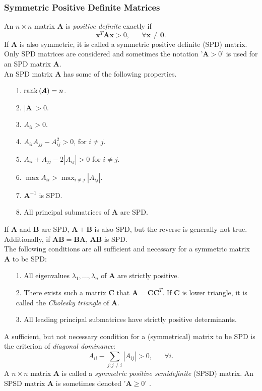 \subsubsection*{Symmetric Positive Definite Matrices}
An $n \times n$ matrix $\pmb{A}$ is \textit{positive definite} exactly if
\begin{equation*}
    \pmb{x}^T\pmb{A}\pmb{x}>0,\hspace{20pt}\forall\pmb{x}\neq\pmb{0}.
\end{equation*}
If $\pmb{A}$ is also symmetric, it is called a symmetric positive definite (SPD) matrix. Only SPD matrices are considered and sometimes the notation '$\pmb{A}>0$' is used for an SPD matrix $\pmb{A}$. \\
An SPD matrix $\pmb{A}$ has some of the following properties.
\begin{itemize}
    \item[1.] $\hbox{rank}\left(\pmb{A}\right)=n$.
    \item[2.] $|\pmb{A}|>0$.
    \item[3.] $A_{ii}>0$.
    \item[4.] $A_{ii}A_{jj}-A_{ij}^2>0$, for $i\neq j$.
    \item[5.] $A_{ii} + A_{jj}-2|A_{ij}|>0$ for $i\neq j$.
    \item[6.] $\max A_{ii}>\max_{i\neq j}|A_{ij}|$.
    \item[7.] $\pmb{A}^{-1}$ is SPD.
    \item[8.] All principal submatrices of $\pmb{A}$ are SPD.
\end{itemize}
If $\pmb{A}$ and $\pmb{B}$ are SPD, $\pmb{A}+\pmb{B}$ is also SPD, but the reverse is generally not true. Additionally, if $\pmb{AB}=\pmb{BA}$, $\pmb{AB}$ is SPD. \\
The following conditions are all sufficient and necessary for a symmetric matrix $\pmb{A}$ to be SPD:
\begin{itemize}
    \item[1.] All eigenvalues $\lambda_1,...,\lambda_n$ of $\pmb{A}$ are strictly positive.
    \item[2.] There exists such a matrix $\pmb{C}$ that $\pmb{A}=\pmb{CC}^T$. If $\pmb{C}$ is lower triangle, it is called the \textit{Cholesky triangle} of $\pmb{A}$.
    \item[3.] All leading principal submatrices have strictly positive determinants.
\end{itemize}    
A sufficient, but not necessary condition for a (symmetrical) matrix to be SPD is the criterion of \textit{diagonal dominance}:
    \begin{equation*}
        A_{ii}-\sum_{j:j\neq i}|A_{ij}|>0,\hspace{20pt}\forall i.
    \end{equation*}
    A $n\times n$ matrix $\pmb{A}$ is called a \textit{symmetric positive semidefinite} (SPSD) matrix. An SPSD matrix $\pmb{A}$ is sometimes denoted '$\pmb{A}\geq0$' \autocite[][18--19]{rue2005gaussian}.
\clearpage
